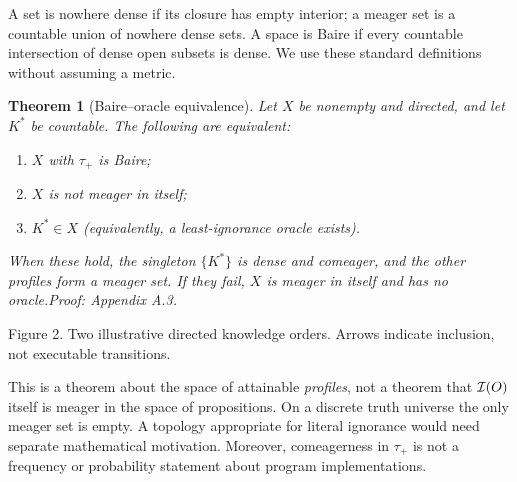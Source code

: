 \documentclass[11pt]{article}
\newtheorem{theorem}{Theorem}[section]
\newcommand{\pf}[1]{\unskip\hspace{.6em plus 1fill}\textit{Proof: Appendix A.#1.}}
\begin{document}
A set is nowhere dense if its closure has empty interior; a meager set is a countable union of nowhere dense sets. A space is Baire if every countable intersection of dense open subsets is dense. We use these standard definitions without assuming a metric.
\begin{theorem}[Baire--oracle equivalence]\label{th:baire}
Let $X$ be nonempty and directed, and let $K^*$ be countable. The following are equivalent:
\begin{enumerate}[label=(\roman*)]
\item $X$ with $\tau_+$ is Baire;
\item $X$ is not meager in itself;
\item $K^*\in X$ (equivalently, a least-ignorance oracle exists).
\end{enumerate}
When these hold, the singleton $\{K^*\}$ is dense and comeager, and the other profiles form a meager set. If they fail, $X$ is meager in itself and has no oracle.\pf{3}
\end{theorem}
\begin{center}

\small Figure 2. Two illustrative directed knowledge orders. Arrows indicate inclusion, not executable transitions.
\end{center}
This is a theorem about the space of attainable \emph{profiles}, not a theorem that $\mathcal I(O)$ itself is meager in the space of propositions. On a discrete truth universe the only meager set is empty. A topology appropriate for literal ignorance would need separate mathematical motivation. Moreover, comeagerness in $\tau_+$ is not a frequency or probability statement about program implementations.
\end{document}
